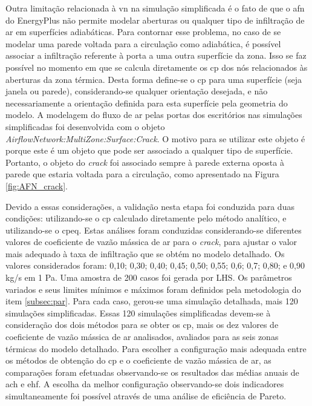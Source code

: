 \documentclass[brazil,hardcopy,openany]{ufscthesis} %
\begin{document}
Outra limitação relacionada à \acrshort{vn} na simulação simplificada é o fato de que o \acrshort{afn} do EnergyPlus não permite modelar aberturas ou qualquer tipo de infiltração de ar em superfícies adiabáticas. Para contornar esse problema, no caso de se modelar uma parede voltada para a circulação como adiabática, é possível associar a infiltração referente à porta a uma outra superfície da zona.  %
Isso se faz possível no momento em que se calcula diretamente os \acrfull{cp} dos nós relacionados às aberturas da zona térmica.
Desta forma define-se o \acrshort{cp} para uma superfície (seja janela ou parede), considerando-se qualquer orientação desejada, e não necessariamente a orientação definida para esta superfície pela geometria do modelo.		
A modelagem do fluxo de ar pelas portas dos escritórios nas simulações simplificadas foi desenvolvida com o objeto \textit{AirflowNetwork:MultiZone:Surface:Crack}. O motivo para se utilizar este objeto é porque este é um objeto que pode ser associado a qualquer tipo de superfície. Portanto, o objeto do \textit{crack} foi associado sempre à parede externa oposta à parede que estaria voltada para a circulação, como apresentado na Figura \ref{fig:AFN_crack}.

Devido a essas considerações, a validação nesta etapa foi conduzida para duas condições: utilizando-se o \acrshort{cp} calculado diretamente pelo método analítico, e utilizando-se o \acrfull{cpeq}.		
Estas análises foram conduzidas considerando-se diferentes valores de coeficiente de vazão mássica de ar para o \textit{crack}, para ajustar o valor mais adequado à taxa de infiltração que se obtém no modelo detalhado. Os valores considerados foram: 0,10; 0,30; 0,40; 0,45; 0,50; 0,55; 0,6; 0,7; 0,80; e 0,90 kg/s em 1 Pa.
Uma amostra de 200 casos foi gerada por LHS.
Os parâmetros variados e seus limites mínimos e máximos foram definidos pela metodologia do item \ref{subsec:par}.
Para cada caso, gerou-se uma simulação detalhada, mais 120 simulações simplificadas. Essas 120 simulações simplificadas devem-se à consideração dos dois métodos para se obter os \acrshort{cp}, mais os dez valores de coeficiente de vazão mássica de ar analisados, avaliados para as seis zonas térmicas do modelo detalhado. 
Para escolher a configuração mais adequada entre os métodos de obtenção do \acrshort{cp} e o coeficiente de vazão mássica de ar, as comparações foram efetuadas observando-se os resultados das médias anuais de \acrshort{ach} e \acrshort{ehf}.
A escolha da melhor configuração observando-se dois indicadores simultaneamente foi possível através de uma análise de eficiência de Pareto.
\end{document}

